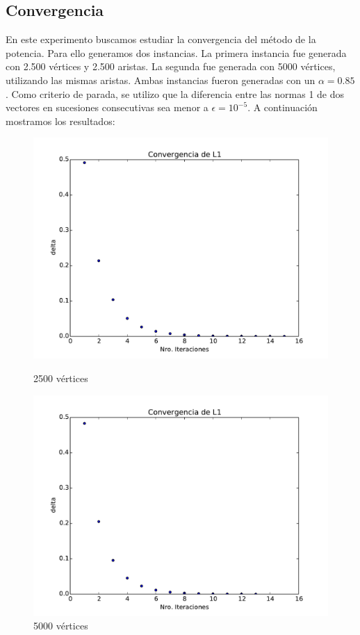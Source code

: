 \pagebreak
\subsection{Convergencia}

En este experimento buscamos estudiar la convergencia del método de la potencia. Para ello generamos dos instancias. La primera instancia fue generada con 2.500 vértices y 2.500 aristas. La segunda fue generada con 5000 vértices, utilizando las mismas aristas. Ambas instancias fueron generadas con un $\alpha = 0.85$. Como criterio de parada, se utilizo que la diferencia entre las normas 1 de dos vectores en sucesiones consecutivas sea menor a $\epsilon = 10^{-5}$. A continuación mostramos los resultados:

\begin{figure}[h]
  \centering
  \begin{minipage}[b]{0.49\textwidth}
  \includegraphics[scale=0.5]{images/conv_2265.pdf}
  \caption{2500 vértices}
  \end{minipage}
  \hfill
  \begin{minipage}[b]{0.49\textwidth}
  \includegraphics[scale=0.5]{images/conv_5000.pdf}
  \caption{5000 vértices}
  \end{minipage}
\end{figure}

